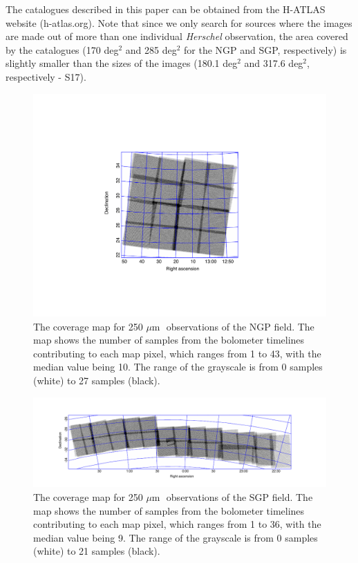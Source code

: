 \documentclass[useAMS,usenatbib]{mnras}
\def\mic{ $\mu $m\,}
\begin{document}
The catalogues described in this paper can be obtained from the 
H-ATLAS website (h-atlas.org).
Note that since we only search for sources where the images
are made out of more than one individual {\it Herschel} observation,
the area covered by the catalogues (170 deg$^2$ and 285 deg$^2$ for the
NGP and SGP, respectively) is slightly smaller than the
sizes of the images (180.1 deg$^2$ and 317.6 deg$^2$, respectively - S17).

\begin{figure} %
\includegraphics[scale=0.9]{ngpcoverage.pdf}
\caption{\protect\label{skymapn} The coverage map for 250\mic\ observations
of the NGP field.
The map shows the number of samples from the bolometer timelines contributing
to each map pixel, which ranges from 1 to 43, with the median value being 10.
The range of the grayscale is from 0 samples (white) to 27 samples
(black).}

\end{figure}

\begin{figure} %
\includegraphics[scale=1.]{sgpcoverage.pdf}
\caption{ \protect\label{skymaps} 
The coverage map for 250\mic\ observations
of the SGP field.
The map shows the number of samples from the bolometer timelines contributing
to each map pixel, which ranges from 1 to 36, with the median value being 9.
The range of the grayscale is from 0 samples (white) to 21 samples
(black).}
\end{figure}
\end{document}
